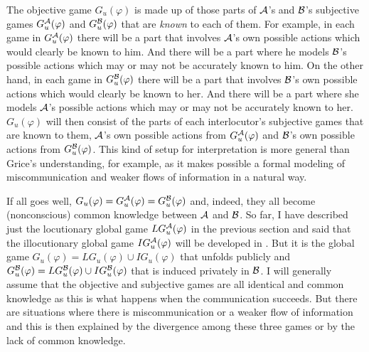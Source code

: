 The objective game $G_u(\varphi)$ is made up of those parts of $\cal A$'s and $\cal B$'s subjective games $G^{\cal A}_u(\varphi)$ and $G^{\cal B}_u(\varphi)$ that are \emph{known} to each of them. For example, in each game in $G^{\cal A}_u(\varphi)$ there will be a part that involves $\cal A$'s own possible actions which would clearly be known to him. And there will be a part where he models $\cal B$'s possible actions which may or may not be accurately known to him. On the other hand, in each game in $G^{\cal B}_u(\varphi)$ there will be a part that involves $\cal B$'s own possible actions which would clearly be known to her. And there will be a part where she models $\cal A$'s possible actions which may or may not be accurately known to her. $G_u(\varphi)$ will then consist of the parts of each interlocutor's subjective games that are known to them, $\cal A$'s own possible actions from $G^{\cal A}_u(\varphi)$ and $\cal B$'s own possible actions from $G^{\cal B}_u(\varphi)$. This kind of setup for interpretation is more general than Grice's understanding, for example, as it makes possible a formal modeling of miscommunication and weaker flows of information in a natural way.

If all goes well, $G_u(\varphi) = G^{\cal A}_u(\varphi) = G^{\cal B}_u(\varphi)$ and, indeed, they all become (nonconscious) common knowledge between $\cal A$ and $\cal B$. So far, I have described just the locutionary global game $LG^{\cal A}_u(\varphi)$ in the previous section and said that the illocutionary global game $IG^{\cal A}_u(\varphi)$ will be developed in . But it is the global game $G_u(\varphi) = LG_u(\varphi) \cup IG_u(\varphi)$ that unfolds publicly and $G^{\cal B}_u(\varphi) = LG^{\cal B}_u(\varphi) \cup IG^{\cal B}_u(\varphi)$ that is induced privately in $\cal B$. I will generally assume that the objective and subjective games are all identical and common knowledge as this is what happens when the communication succeeds. But there are situations where there is miscommunication or a weaker flow of information and this is then explained by the divergence among these three games or by the lack of common knowledge. 

